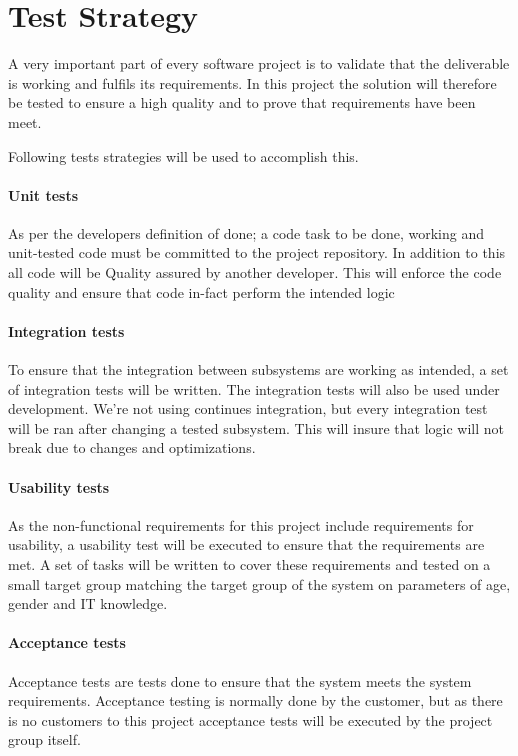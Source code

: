 \documentclass[../report.tex]{subfiles}
\begin{document}
\graphicspath{{img/}{../img/}}

\section{Test Strategy}

A very important part of every software project is to validate that the deliverable is working and fulfils its requirements. In this project the solution will therefore be tested to ensure a high quality and to prove that requirements have been meet.

Following tests strategies will be used to accomplish this.

\paragraph{Unit tests}
As per the developers definition of done; a code task to be done, working and unit-tested code must be committed to the project repository. In addition to this all code will be Quality assured by another developer. This will enforce the code quality and ensure that code in-fact perform the intended logic

\paragraph{Integration tests}

To ensure that the integration between subsystems are working as intended, a set of integration tests will be written. The integration tests will also be used under development. We're not using continues integration, but every integration test will be ran after changing a tested subsystem. This will insure that logic will not break due to changes and optimizations.

\paragraph{Usability tests}
As the non-functional requirements for this project include requirements for usability, a usability test will be executed to ensure that the requirements are met. A set of tasks will be written to cover these requirements and tested on a small target group matching the target group of the system on parameters of age, gender and IT knowledge.

\paragraph{Acceptance tests}
Acceptance tests are tests done to ensure that the system meets the system requirements. Acceptance testing is normally done by the customer, but as there is no customers to this project acceptance tests will be executed by the project group itself.
\end{document}

